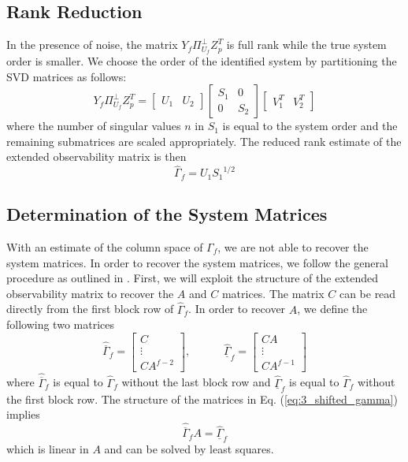 \subsection{Rank Reduction}\label{sec:3_rank_reduction}
In the presence of noise, the matrix $Y_f\Pi_{U_f}^\perp Z_p^T$ is full rank while the true system order is smaller. We choose the order of the identified system by partitioning the SVD matrices as follows:
\begin{equation*}
Y_f\Pi_{U_f}^\perp Z_p^T = 
\begin{bmatrix}U_1 & U_2\end{bmatrix}
\begin{bmatrix}S_1 & 0\\ 0 & S_2\end{bmatrix}
\begin{bmatrix}V_1^T & V_2^T\end{bmatrix}
\end{equation*}
where the number of singular values $n$ in $S_1$ is equal to the system order and the remaining submatrices are scaled appropriately. The reduced rank estimate of the extended observability matrix is then
\begin{equation}
\hat{\Gamma}_f = U_1 {S_1}^{1/2}
\end{equation}


\subsection{Determination of the System Matrices}\label{sec:3_system_matrices}
With an estimate of the column space of $\Gamma_f$, we are not able to recover the system matrices. In order to recover the system matrices, we follow the general procedure as outlined in \cite{katayama2005subspace}. First, we will exploit the structure of the extended observability matrix to recover the $A$ and $C$ matrices. The matrix $C$ can be read directly from the first block row of $\hat{\Gamma}_f$. In order to recover $A$, we define the following two matrices 
\begin{equation}\label{eq:3_shifted_gamma}
\hat{\overline{\Gamma}}_f = \begin{bmatrix}C\\ \vdots \\ CA^{f-2}\end{bmatrix}, \hspace{3em}
\hat{\underline{\Gamma}}_f = \begin{bmatrix}CA\\ \vdots \\ CA^{f-1}\end{bmatrix}
\end{equation}
where $\hat{\overline{\Gamma}}_f$ is equal to $\hat{\Gamma}_f$ without the last block row and $\hat{\underline{\Gamma}}_f$ is equal to $\hat{\Gamma}_f$ without the first block row. The structure of the matrices in Eq. (\ref{eq:3_shifted_gamma}) implies
\begin{equation}
\hat{\overline{\Gamma}}_f A = \hat{\underline{\Gamma}}_f
\end{equation}
which is linear in $A$ and can be solved by least squares.

